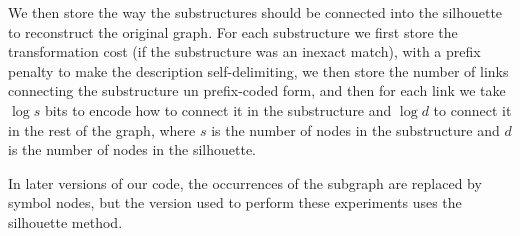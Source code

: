 \documentclass{article}
\begin{document}
We then store the way the substructures should be connected into the silhouette to reconstruct the original graph. For each substructure we first store the transformation cost (if the substructure was an inexact match), with a prefix penalty to make the description self-delimiting, we then store the number of links connecting the substructure un prefix-coded form, and then for each link we take $\log s$ bits to encode how to connect it in the substructure and $\log d$ to connect it in the rest of the graph, where $s$ is the number of nodes in the substructure and $d$ is the number of nodes in the silhouette.

In later versions of our code, the occurrences of the subgraph are replaced by symbol nodes, but the version used to perform these experiments uses the silhouette method. 

 

\end{document}
